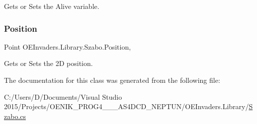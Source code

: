 Gets or Sets the Alive variable. 

\mbox{\label{class_o_e_invaders_1_1_library_1_1_szabo_a4e487030753eb2c808b72a1fe4300b82}} 
\subsubsection{\texorpdfstring{Position}{Position}}
{\footnotesize\ttfamily Point O\+E\+Invaders.\+Library.\+Szabo.\+Position\hspace{0.3cm}{\ttfamily [get]}, {\ttfamily [set]}}



Gets or Sets the 2D position. 



The documentation for this class was generated from the following file\+:\begin{DoxyCompactItemize}
\item 
C\+:/\+Users/\+D/\+Documents/\+Visual Studio 2015/\+Projects/\+O\+E\+N\+I\+K\+\_\+\+P\+R\+O\+G4\+\_\+\_\+\_\+\+A\+S4\+D\+C\+D\+\_\+\+N\+E\+P\+T\+U\+N/\+O\+E\+Invaders.\+Library/\mbox{\hyperlink{_szabo_8cs}{Szabo.\+cs}}\end{DoxyCompactItemize}
